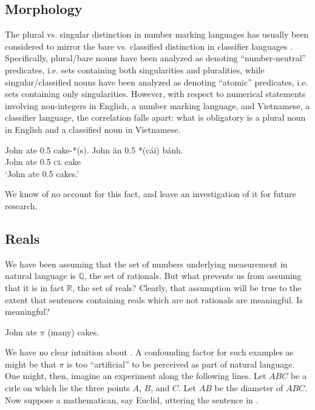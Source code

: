 \documentclass[output=paper]{langscibook}
\begin{document}
\subsection{Morphology}\largerpage[2]

The plural vs. singular distinction in number marking languages has usually been considered to mirror the bare vs. classified distinction in classifier languages \citep[cf.][]{Chierchia:1998, cheng1999bare}. Specifically, plural/bare nouns have been analyzed as denoting ``number-neutral'' predicates, i.e. sets containing both singularities and pluralities, while singular/classified nouns have been analyzed as denoting ``atomic'' predicates, i.e. sets containing only singularities. However, with respect to numerical statements involving non-integers in English, a number marking language, and Vietnamese, a classifier language, the correlation falls apart: what is obligatory is a plural noun in English and a classified noun in Vietnamese.

\ea
\ea John ate 0.5 cake-*(s).
\ex \gll John ăn 0.5 *(cái) bánh.\\
         John ate 0.5 \textsc{cl} cake\\
    \glt `John ate 0.5 cakes.'     
\z
\z

\noindent We know of no account for this fact, and leave an investigation of it for future research. 

\subsection{Reals}\label{hai-tri:sec:reals}\largerpage

We have been assuming that the set of numbers underlying measurement in natural language is $\mathbb{Q}$, the set of rationals. But what prevents us from assuming that it is in fact $\mathbb{R}$, the set of reals? Clearly, that assumption will be true to the extent that sentences containing reals which are not rationals are meaningful. Is  meaningful?

\ea
John ate $\pi$ (many) cakes.
\label{hai-tri:pi}
\z

\noindent We have no clear intuition about . A confounding factor for such examples as  might be that $\pi$ is too ``artificial'' to be perceived as part of natural language. One might, then, imagine an experiment along the following lines. Let $ABC$ be a cirle on which lie the three points $A$, $B$, and $C$. Let $AB$ be the diameter of $ABC$. Now suppose a mathematican, say Euclid, uttering the sentence in .
\end{document}
